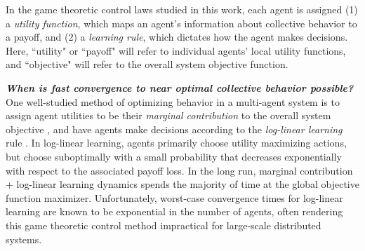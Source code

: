 

In the game theoretic control laws studied in this work, each agent is assigned (1) a \emph{utility function}, which maps an agent's information about collective behavior to a payoff, and (2) a \emph{learning rule}, which dictates how the agent makes decisions. Here, ``utility" or ``payoff" will refer to individual agents' local utility functions, and ``objective" will refer to the overall system objective function.



\noindent\textbf{\emph{When is fast convergence to near optimal collective behavior possible? }}
One well-studied method of optimizing behavior in a multi-agent system is to assign agent utilities to be their \emph{marginal contribution} to the overall system objective \cite{Wolpert1999}, and have agents make decisions according to the \emph{log-linear learning} rule \cite{Blume1993}. In log-linear learning, agents primarily choose utility maximizing actions, but choose suboptimally with a small probability that decreases exponentially with respect to the associated payoff loss. In the long run, marginal contribution + log-linear learning dynamics spends the majority of time at the global objective function maximizer. Unfortunately, worst-case convergence times for log-linear learning are known to be exponential in the number of agents, \cite{Shah2010} often rendering this game theoretic control method impractical for large-scale distributed systems. 

